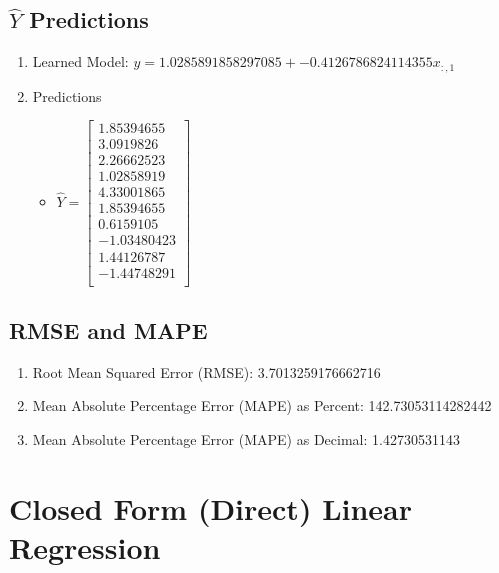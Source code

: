 \documentclass[12pt]{article}
\begin{document}
\subsection{$\hat{Y}$ Predictions}
\begin{enumerate}
   \item Learned Model: $y=1.0285891858297085 + -0.4126786824114355x_{:,1}$
   \item Predictions
   \begin{itemize}
    \item $\hat{Y} = 
        \begin{bmatrix}
        	1.85394655\\
        	3.0919826\\	
        	2.26662523\\
        	1.02858919\\
        	4.33001865\\
        	1.85394655\\
        	0.6159105\\
        	-1.03480423\\
        	1.44126787\\
        	-1.44748291\\
        \end{bmatrix}$
   \end{itemize}
\end{enumerate}

\subsection{RMSE and MAPE}

\begin{enumerate}
   \item Root Mean Squared Error (RMSE): 3.7013259176662716
   \item Mean Absolute Percentage Error (MAPE) as Percent: 142.73053114282442
   \item Mean Absolute Percentage Error (MAPE) as Decimal: 1.42730531143
\end{enumerate}

\newpage
\section{Closed Form (Direct) Linear Regression}
\end{document}
